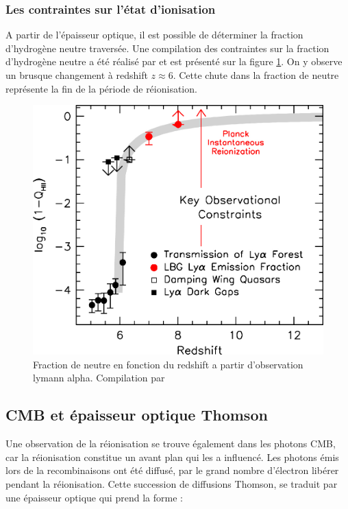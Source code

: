 \subsubsection{Les contraintes sur l'état d'ionisation}

A partir de l'épaisseur optique, il est possible de déterminer la fraction d'hydrogène neutre traversée.
Une compilation des contraintes sur la fraction d'hydrogène neutre a été réalisé par \cite{2015ApJ...811..140B} et est présenté sur la figure \ref{fig:compile_constrains}.
On y observe un brusque changement à redshift $z\approx6$.
Cette chute dans la fraction de neutre représente la fin de la période de réionisation.

\begin{figure}
        \includegraphics[width=.95\linewidth]{img/01/xionconstrains.jpg} 
        \caption[Fraction de neutre]{Fraction de neutre en fonction du redshift a partir d'observation lymann alpha.
        Compilation par \cite{2015ApJ...811..140B}}
 		\label{fig:compile_constrains}
\end{figure}


\subsection{CMB et épaisseur optique Thomson}

Une observation de la réionisation se trouve également dans les photons CMB, car la réionisation constitue un avant plan qui les a influencé. 
Les photons émis lors de la recombinaisons ont été diffusé, par le grand nombre d'électron libérer pendant la réionisation.
Cette succession de diffusions Thomson, se traduit par une épaisseur optique qui prend la forme : 

